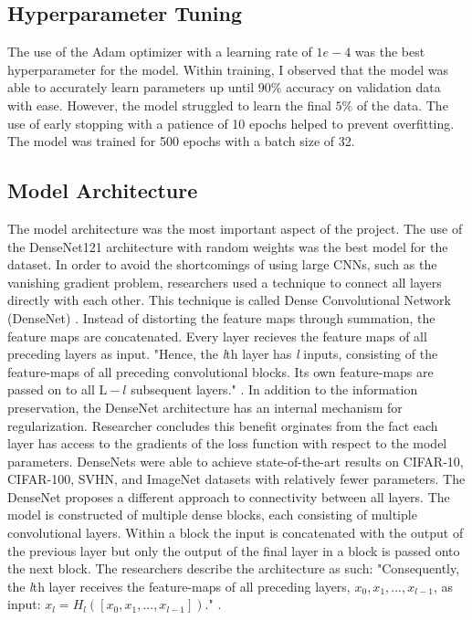 \documentclass[conference]{IEEEtran}
\begin{document}
\subsection{Hyperparameter Tuning}
The use of the Adam optimizer with a learning rate of $1e-4$ was the best hyperparameter for the model. Within training, I observed that the model was able to accurately learn parameters up until $90\%$ accuracy on validation data with ease. However, the model struggled to learn the final $5\%$ of the data. The use of early stopping with a patience of 10 epochs helped to prevent overfitting. The model was trained for 500 epochs with a batch size of 32.

\subsection{Model Architecture}
The model architecture was the most important aspect of the project. The use of the DenseNet121 architecture with random weights was the best model for the dataset. In order to avoid the shortcomings of using large CNNs, such as the vanishing gradient problem, researchers used a technique to connect all layers directly with each other. This technique is called Dense Convolutional Network (DenseNet) \cite{DBLP:journals/corr/HuangLW16a}. Instead of distorting the feature maps through summation, the feature maps are concatenated. Every layer recieves the feature maps of all preceding layers as input. "Hence, the \textit{l}th layer has \textit{l} inputs, consisting of the feature-maps of all preceding convolutional blocks. Its own feature-maps are passed on to all $\text{L}-l$ subsequent layers." \cite{DBLP:journals/corr/HuangLW16a}. In addition to the information preservation, the DenseNet architecture has an internal mechanism for regularization. Researcher concludes this benefit orginates from the fact each layer has access to the gradients of the loss function with respect to the model parameters. DenseNets were able to achieve state-of-the-art results on CIFAR-10, CIFAR-100, SVHN, and ImageNet datasets with relatively fewer parameters. The DenseNet proposes a different approach to connectivity between all layers. The model is constructed of multiple dense blocks, each consisting of multiple convolutional layers. Within a block the input is concatenated with the output of the previous layer but only the output of the final layer in a block is passed onto the next block. The researchers describe the architecture as such: "Consequently, the \textit{l}th layer receives the feature-maps of all preceding layers, $x_0, x_1, . . . , x_{l-1}$, as input: $x_l = H_l([x_0, x_1, . . . , x_{l-1}])$." \cite{DBLP:journals/corr/HuangLW16a}.
\end{document}

